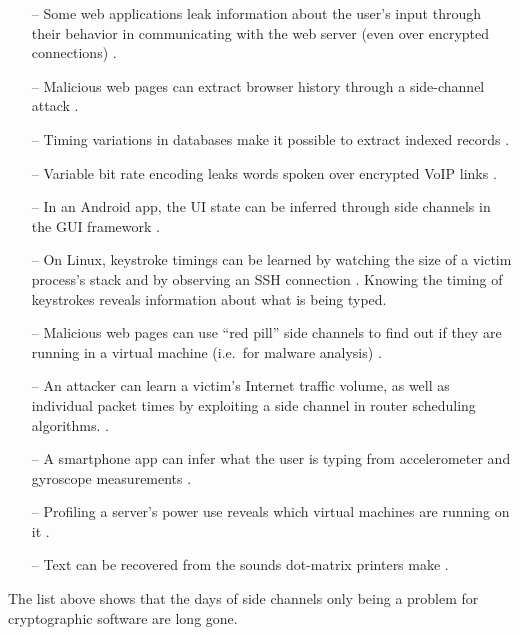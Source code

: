 \documentclass{acm_proc_article-sp}
\begin{document}
\begin{itemize}
    \item[--] Some web applications leak information about the user's input through
          their behavior in communicating with the web server (even over
          encrypted connections) \cite{bortz2007exposing, chen2010side}.
    \item[--] Malicious web pages can extract browser history through a side-channel attack
          \cite{weinberg2011still}. 
    \item[--] Timing variations in databases make it possible to extract
          indexed records \cite{futoransky2007nd2db}.
    \item[--] Variable bit rate encoding leaks words spoken over encrypted VoIP
          links \cite{white2011phonotactic}.
    \item[--] In an Android app, the UI state can be inferred through side channels
          in the GUI framework \cite{chen2014peeking}.
    \item[--] On Linux, keystroke timings can be learned by watching the size of
          a victim process's stack \cite{zhang2009peeping} and by observing an
          SSH connection \cite{song2001timing}. Knowing the timing of keystrokes
          reveals information about what is being typed.
    \item[--] Malicious web pages can use ``red pill'' side channels to find out if
          they are running in a virtual machine (i.e.\ for malware analysis)
          \cite{ho2014tick}.
    \item[--] An attacker can learn a victim's Internet traffic volume, as well as
          individual packet times by exploiting a side channel in router
          scheduling algorithms. \cite{kadloor2010low}.
    \item[--] A smartphone app can infer what the user is typing from accelerometer
          and gyroscope measurements \cite{owusu2012accessory,
          cai2012practicality}.
    \item[--] Profiling a server's power use reveals which virtual machines are
          running on it \cite{hlavacs2011energy}.
    \item[--] Text can be recovered from the sounds dot-matrix printers make
          \cite{backes2010acoustic}.
\end{itemize}

The list above shows that the days of side channels only being a problem for
cryptographic software are long gone. 
\end{document}
